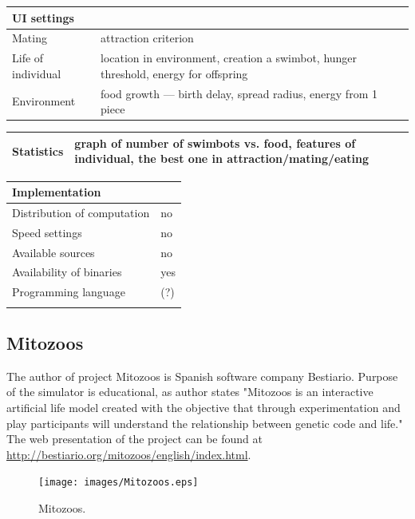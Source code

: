 \documentclass[a4paper,12pt]{report}
\begin{document}
\vspace{10pt}
\begin{tabular}{|p{150pt}|p{220pt}|} \hline \textbf{UI settings}&\\ \hline
Mating&attraction criterion\\ \hline
Life of individual&location in environment, creation a swimbot, hunger threshold, energy for offspring\\ \hline
Environment&food growth --- birth delay, spread radius, energy from 1 piece\\ \hline
\end{tabular} 

\vspace{10pt}
\begin{tabular}{|p{150pt}|p{220pt}|} \hline \textbf{Statistics}&graph of number of swimbots vs. food, features of individual, the best one in attraction/mating/eating\\ \hline
\end{tabular} 

\vspace{10pt}
\begin{tabular}{|p{150pt}|p{220pt}|} \hline \textbf{Implementation}&\\ \hline
Distribution of computation&no\\ \hline
Speed settings&no\\ \hline
Available sources&no\\ \hline
Availability of binaries&yes\\ \hline
Programming language&(?)\\ \hline
&\\ \hline


\end{tabular}

\subsection {Mitozoos}
The author of project Mitozoos is Spanish software company Bestiario. Purpose of the simulator is educational, as author states "Mitozoos is an interactive artificial life model created with the objective that through experimentation and play participants will understand the relationship between genetic code and life." The web presentation of the project can be found at \url{http://bestiario.org/mitozoos/english/index.html}.

\begin{figure}
\begin{center}
  \texttt{[image: images/Mitozoos.eps]}
  \caption{Mitozoos.}
  \label{img.Mitozoos}
\end{center}
\end{figure}
\end{document}
